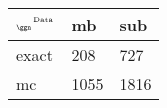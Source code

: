 \begin{tabular}{lll}
    \toprule
    $_{\text{\tiny{\ggn}}}$$^{\text{\tiny{Data}}}$ & mb & sub \\
    \midrule
    exact & 208
              & 727 \\
    mc   & 1055
              & 1816 \\
    \bottomrule
\end{tabular}